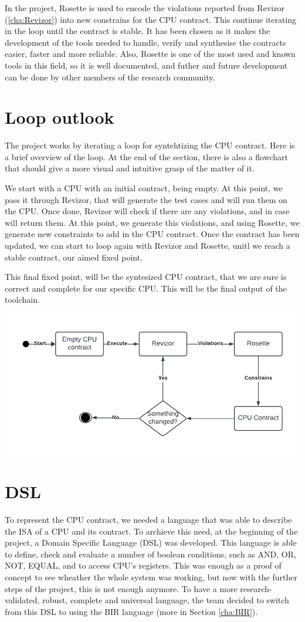 In the project, Rosette is used to encode the violations reported from Revizor (\ref{cha:Revizor})
into new constrains for the CPU contract. This continue iterating in the loop until
the contract is stable. It has been chosen as it makes the development of the
tools needed to handle, verify and synthesise the contracts easier, faster and
more reliable. Also, Rosette is one of the most used and known tools in this
field, so it is well documented, and futher and future development can be done
by other members of the research community.

\section{Loop outlook}
\label{cha: Loop outlook} The project works by iterating a loop for syntehtizing
the CPU contract. Here is a brief overview of the loop. At the end of the
section, there is also a flowchart that should give a more visual and intuitive grasp
of the matter of it.

We start with a CPU with an initial contract, being empty. At this point, we
pass it through Revizor, that will generate the test cases and will run them on the
CPU. Once done, Revizor will check if there are any violations, and in case will
return them. At this point, we generate this violations, and using Rosette, we
generate new constraints to add in the CPU contract. Once the contract has been updated,
we can start to loop again with Revizor and Rosette, unitl we reach a stable contract,
our aimed fixed point.

This final fixed point, will be the syntesized CPU contract, that we are sure is
correct and complete for our specific CPU. This will be the final output of the toolchain.
\begin{center}
  \includegraphics[width=.6\textwidth]{images/Thesis.png}
\end{center}

\section{DSL}
\label{cha:DSL} To represent the CPU contract, we needed a language that was
able to describe the ISA of a CPU and its contract. To archieve this need, at
the beginning of the project, a Domain Specific Language (DSL) was developed.
This language is able to define, check and evaluate a number of boolean conditions,
such as AND, OR, NOT, EQUAL, and to access CPU's registers. This was enough as a
proof of concept to see wheather the whole system was working, but now with the
further steps of the project, this is not enough anymore. To have a more
research-validated, robust, complete and universal language, the team decided to
switch from this DSL to using the BIR language (more in Section \ref{cha:BIR}).

